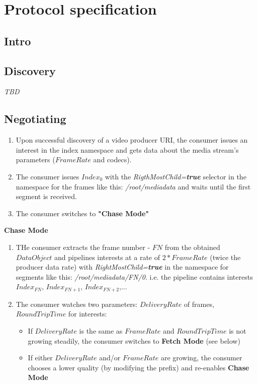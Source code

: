 \documentclass[12pt]{article}
\begin{document}
\section{Protocol specification}
\subsection{Intro}

\subsection{Discovery}
\textit{TBD}

\subsection{Negotiating}
\begin{enumerate}
\item Upon successful discovery of a video producer URI, the consumer issues an interest in the index namespace and gets data about the media stream's parameters ($FrameRate$ and codecs).
\item The consumer issues $Index_{0}$ with the \textit{RigthMostChild=\textbf{true}} selector in the namespace for the frames like this: \textit{/root/mediadata} and waits until the first segment is received.
\item The consumer switches to \textbf{"Chase Mode"}
\end{enumerate}

\textbf{Chase Mode}
\begin{enumerate}
\item THe consumer extracts the frame number - $FN$ from the obtained $DataObject$ and pipelines interests at a rate of $2*FrameRate$ (twice the producer data rate) with \textit{RightMostChild=\textbf{true}} in the namespace for segments like this: \textit{/root/mediadata/FN/0}. i.e. the pipeline contains interests $Index_{FN}$, $Index_{FN+1}$, $Index_{FN+2}$,...

\item The consumer watches two parameters: $DeliveryRate$ of frames, $RoundTripTime$ for interests:
\begin{itemize}
\item If $DeliveryRate$ is the same as $FrameRate$  and $RoundTripTime$ is not growing steadily, the consumer switches to \textbf{Fetch Mode} (see below)
\item If either $DeliveryRate$ and/or $FrameRate$ are growing, the consumer chooses a lower quality (by modifying the prefix) and re-enables \textbf{Chase Mode}
\end{itemize}
\end{enumerate}
\end{document}

